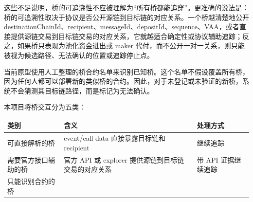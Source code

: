 \documentclass[12pt,a4paper]{ctexart}
\begin{document}
这些不足说明，桥的可追溯性不应被理解为``所有桥都能追穿''。更准确的说法是：桥的可追溯性取决于协议是否公开源链到目标链的对应关系。一个桥越清楚地公开
destinationChainId、recipient、messageId、depositId、sequence、VAA，或者直接提供源链交易到目标链交易的对应关系，它就越适合确定性或协议辅助追踪；反之，如果桥只表现为池化资金进出或
maker 代付，而不公开一对一关系，则只能被视为候选路径、无法确认的位置或追踪停止点。

当前原型使用人工整理的桥合约名单来识别已知桥。这个名单不假设覆盖所有桥，因为任何人都可以部署新的类似桥的合约。因此，对于未登记或未验证的新桥，系统不会猜测其目标链路径，而是标记为无法确认。

本项目将桥交互分为五类：

\begin{longtable}[]{@{}lll@{}}
\toprule
\begin{minipage}[b]{0.30\columnwidth}\raggedright
类别\strut
\end{minipage} & \begin{minipage}[b]{0.30\columnwidth}\raggedright
含义\strut
\end{minipage} & \begin{minipage}[b]{0.30\columnwidth}\raggedright
处理方式\strut
\end{minipage}\tabularnewline
\midrule
\endhead
\begin{minipage}[t]{0.30\columnwidth}\raggedright
可直接解析的桥\strut
\end{minipage} & \begin{minipage}[t]{0.30\columnwidth}\raggedright
event/call data 直接暴露目标链和 recipient\strut
\end{minipage} & \begin{minipage}[t]{0.30\columnwidth}\raggedright
继续追踪\strut
\end{minipage}\tabularnewline
\begin{minipage}[t]{0.30\columnwidth}\raggedright
需要官方接口辅助的桥\strut
\end{minipage} & \begin{minipage}[t]{0.30\columnwidth}\raggedright
官方 API 或 explorer 提供源链到目标链交易的对应关系\strut
\end{minipage} & \begin{minipage}[t]{0.30\columnwidth}\raggedright
带 API 证据继续追踪\strut
\end{minipage}\tabularnewline
\begin{minipage}[t]{0.30\columnwidth}\raggedright
只能识别合约的桥\strut
\end{minipage} & \begin{minipage}[t]{0.30\columnwidth}\raggedright

\end{minipage}
\end{longtable}
\end{document}

